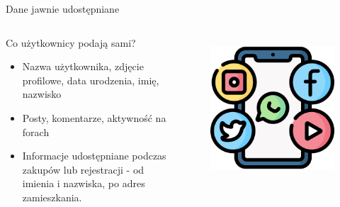   
  \begin{frame}{Dane jawnie udostępniane}
  \begin{columns}[c]
      \begin{alertblock}{Co użytkownicy podają sami?}
        \begin{itemize}
          \item Nazwa użytkownika, zdjęcie profilowe, data urodzenia, imię, nazwisko
          \item Posty, komentarze, aktywność na forach
          \item Informacje udostępniane podczas zakupów lub rejestracji - od imienia i nazwiska, po adres zamieszkania. \cite{CYB_DEF_NAJCZĘSTRZE_DANE}
        \end{itemize}
      \end{alertblock}
      \begin{figure}
        \centering
        \includegraphics[height=0.45\textheight]{images/social-media.png}
        \label{fig:social-media}
      \end{figure}
  \end{columns}
  \end{frame}
  
